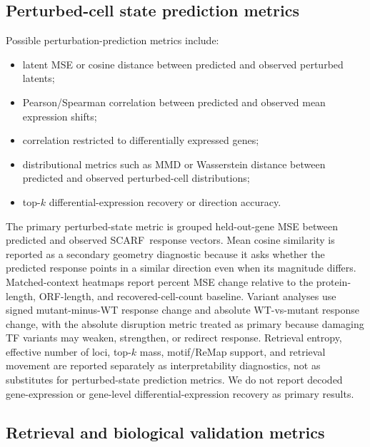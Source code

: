 \documentclass[11pt]{article}
\newcommand{\scarf}{\textsc{SCARF}}
\begin{document}
\subsection{Perturbed-cell state prediction metrics}

Possible perturbation-prediction metrics include:
\begin{itemize}
    \item latent MSE or cosine distance between predicted and observed perturbed latents;
    \item Pearson/Spearman correlation between predicted and observed mean expression shifts;
    \item correlation restricted to differentially expressed genes;
    \item distributional metrics such as MMD or Wasserstein distance between predicted and observed perturbed-cell distributions;
    \item top-\(k\) differential-expression recovery or direction accuracy.
\end{itemize}

The primary perturbed-state metric is grouped held-out-gene MSE between predicted and observed \scarf\ response vectors. Mean cosine similarity is reported as a secondary geometry diagnostic because it asks whether the predicted response points in a similar direction even when its magnitude differs. Matched-context heatmaps report percent MSE change relative to the protein-length, ORF-length, and recovered-cell-count baseline. Variant analyses use signed mutant-minus-WT response change and absolute WT-vs-mutant response change, with the absolute disruption metric treated as primary because damaging TF variants may weaken, strengthen, or redirect response. Retrieval entropy, effective number of loci, top-\(k\) mass, motif/ReMap support, and retrieval movement are reported separately as interpretability diagnostics, not as substitutes for perturbed-state prediction metrics. We do not report decoded gene-expression or gene-level differential-expression recovery as primary results.

\subsection{Retrieval and biological validation metrics}
\end{document}
